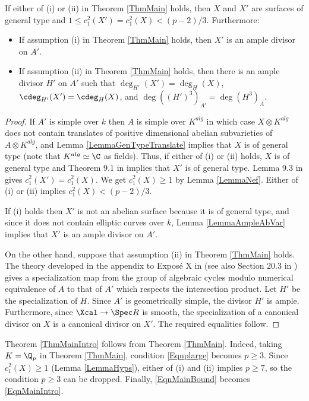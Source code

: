\begin{lemma}
\notready\label{LemmaHyps} If either of (i) or (ii) in Theorem \ref{ThmMain} holds, then $X$ and $X'$ are surfaces of general type and $1\le c_1^2(X')=c_1^2(X)<(p-2)/3$. Furthermore:

\begin{itemize}

\item If assumption (i) in Theorem \ref{ThmMain} holds, then $X'$  is an ample divisor on $A'$.

\item If assumption (ii) in Theorem \ref{ThmMain} holds, then there is an ample divisor $H'$ on $A'$ such that $\deg_{H'}(X')=\deg_H(X)$, $\cdeg_{H'}(X')=\cdeg_H(X)$, and $\deg((H')^3)_{A'}=\deg(H^3)_A$.
\end{itemize}
\end{lemma}
\begin{proof} If $A'$ is simple over $k$ then $A$ is simple over $K^{alg}$ in which case $X\otimes K^{alg}$ does not contain translates of positive dimensional abelian subvarieties of $A\otimes K^{alg}$, and Lemma \ref{LemmaGenTypeTranslate} implies that $X$ is of general type (note that $K^{alg}\simeq \C$ as fields). Thus, if either of (i) or (ii) holds, $X$ is of general type and Theorem 9.1 in \cite{KatsuraUeno} implies that $X'$ is of general type. Lemma 9.3 in \cite{KatsuraUeno} gives $c_1^2(X')=c_1^2(X)$. We get $c_1^2(X)\ge 1$ by Lemma \ref{LemmaNef}. Either of (i) or (ii) implies $c_1^2(X)< (p-2)/3$.

If (i) holds then $X'$ is not an abelian surface because it is of general type, and since it does not contain elliptic curves over $k$, Lemma \ref{LemmaAmpleAbVar} implies that $X'$ is an ample divisor on $A'$.

On the other hand, suppose that assumption (ii)  in Theorem \ref{ThmMain} holds. The  theory developed in the appendix to Expos\'e X in \cite{SGA6} (see also Section 20.3 in \cite{FultonInt}) gives a specialization map from the group of algebraic cycles  modulo numerical equivalence of $A$ to that of $A'$ which respects the intersection product. Let $H'$ be the specialization of $H$. Since $A'$ is geometrically simple, the divisor $H'$ is ample. Furthermore, since $\Xcal\to \Spec R$ is smooth, the specialization of a canonical divisor on $X$ is a canonical divisor on $X'$. The required equalities follow.
\end{proof}
\begin{remark}
\notready\label{RmkMainToIntro} Theorem \ref{ThmMainIntro} follows from Theorem \ref{ThmMain}. Indeed, taking $K=\Q_p$ in Theorem \ref{ThmMain}, condition \eqref{Eqnplarge} becomes $p\ge 3$. Since $c_1^2(X)\ge 1$ (Lemma \ref{LemmaHyps}), either of (i) and (ii) implies $p\ge 7$, so the condition $p\ge 3$ can be dropped. Finally, \eqref{EqnMainBound} becomes \eqref{EqnMainIntro}.
\end{remark}


